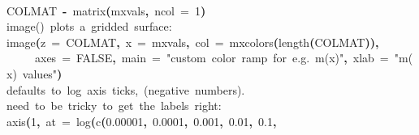 \documentclass[a4paper]{article}
\newcommand{\hlnumber}[1]{\textcolor[rgb]{0.0823529411764706,0.0784313725490196,0.709803921568627}{#1}}%
\newcommand{\hlfunctioncall}[1]{\textcolor[rgb]{1,0,0}{#1}}%
\newcommand{\hlstring}[1]{\textcolor[rgb]{0.6,0.6,1}{#1}}%
\newcommand{\hlkeyword}[1]{\textcolor[rgb]{0,0,0}{\textbf{#1}}}%
\newcommand{\hlargument}[1]{\textcolor[rgb]{0.694117647058824,0.247058823529412,0.0196078431372549}{#1}}%
\newcommand{\hlcomment}[1]{\textcolor[rgb]{0.8,0.8,0.8}{#1}}%
\newcommand{\hlassignement}[1]{\textcolor[rgb]{0.215686274509804,0.215686274509804,0.384313725490196}{\textbf{#1}}}%
\newcommand{\hlsymbol}[1]{\textcolor[rgb]{0,0,0}{#1}}%
\newcommand{\hlprompt}[1]{\textcolor[rgb]{0,0,0}{#1}}%
\newcommand{\hlstd}[1]{\textcolor[rgb]{0,0,0}{#1}}%
\newenvironment{Houtput}{\raggedright}{%
%
}
\begin{document}
\begin{Houtput}
\normalfont
\hspace*{\fill}\\
\hlstd{}\ttfamily\noindent
\hlprompt{\usebox{\hlnormalsizeboxgreaterthan}{\ }}\hlsymbol{COLMAT}{\ }\hlassignement{\usebox{\hlnormalsizeboxlessthan}-}{\ }\hlfunctioncall{matrix}\hlkeyword{(}\hlsymbol{mxvals}\hlkeyword{,}{\ }\hlargument{ncol}{\ }\hlargument{=}{\ }\hlnumber{1}\hlkeyword{)}\mbox{}
\normalfont
\hspace*{\fill}\\
\hlstd{}\ttfamily\noindent
\hlprompt{\usebox{\hlnormalsizeboxgreaterthan}{\ }}\hlcomment{\usebox{\hlnormalsizeboxhash}{\ }image(){\ }plots{\ }a{\ }gridded{\ }surface:}\mbox{}
\normalfont
\hspace*{\fill}\\
\hlstd{}\ttfamily\noindent
\hlprompt{\usebox{\hlnormalsizeboxgreaterthan}{\ }}\hlfunctioncall{image}\hlkeyword{(}\hlargument{z}{\ }\hlargument{=}{\ }\hlsymbol{COLMAT}\hlkeyword{,}{\ }\hlargument{x}{\ }\hlargument{=}{\ }\hlsymbol{mxvals}\hlkeyword{,}{\ }\hlargument{col}{\ }\hlargument{=}{\ }\hlfunctioncall{mxcolors}\hlkeyword{(}\hlfunctioncall{length}\hlkeyword{(}\hlsymbol{COLMAT}\hlkeyword{)}\hlkeyword{)}\hlkeyword{,}\hspace*{\fill}\\
\hlstd{}\hlprompt{{\ }}{\ }{\ }{\ }{\ }\hlargument{axes}{\ }\hlargument{=}{\ }\hlnumber{FALSE}\hlkeyword{,}{\ }\hlargument{main}{\ }\hlargument{=}{\ }\hlstring{"custom{\ }color{\ }ramp{\ }for{\ }e.g.{\ }m(x)"}\hlkeyword{,}{\ }\hlargument{xlab}{\ }\hlargument{=}{\ }\hlstring{"m(x){\ }values"}\hlkeyword{)}\mbox{}
\normalfont
\hspace*{\fill}\\
\hlstd{}\ttfamily\noindent
\hlprompt{\usebox{\hlnormalsizeboxgreaterthan}{\ }}\hlcomment{\usebox{\hlnormalsizeboxhash}{\ }defaults{\ }to{\ }log{\ }axis{\ }ticks,{\ }(negative{\ }numbers).}\mbox{}
\normalfont
\hspace*{\fill}\\
\hlstd{}\ttfamily\noindent
\hlprompt{\usebox{\hlnormalsizeboxgreaterthan}{\ }}\hlcomment{\usebox{\hlnormalsizeboxhash}{\ }need{\ }to{\ }be{\ }tricky{\ }to{\ }get{\ }the{\ }labels{\ }right:}\mbox{}
\normalfont
\hspace*{\fill}\\
\hlstd{}\ttfamily\noindent
\hlprompt{\usebox{\hlnormalsizeboxgreaterthan}{\ }}\hlfunctioncall{axis}\hlkeyword{(}\hlnumber{1}\hlkeyword{,}{\ }\hlargument{at}{\ }\hlargument{=}{\ }\hlfunctioncall{log}\hlkeyword{(}\hlfunctioncall{c}\hlkeyword{(}\hlnumber{0.00001}\hlkeyword{,}{\ }\hlnumber{0.0001}\hlkeyword{,}{\ }\hlnumber{0.001}\hlkeyword{,}{\ }\hlnumber{0.01}\hlkeyword{,}{\ }\hlnumber{0.1}\hlkeyword{,}\hspace*{\fill}\\

\end{Houtput}
\end{document}

